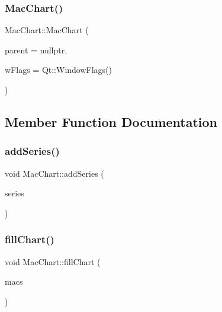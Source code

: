 \subsubsection{\texorpdfstring{Mac\+Chart()}{MacChart()}}
{\footnotesize\ttfamily Mac\+Chart\+::\+Mac\+Chart (\begin{DoxyParamCaption}\item[{Q\+Graphics\+Item $\ast$}]{parent = {\ttfamily nullptr},  }\item[{Qt\+::\+Window\+Flags}]{w\+Flags = {\ttfamily Qt\+:\+:WindowFlags()} }\end{DoxyParamCaption})\hspace{0.3cm}{\ttfamily [explicit]}}



\subsection{Member Function Documentation}
\mbox{\label{class_mac_chart_aef583e4cf5c78a34c43c9f86a08eefee}} 
\subsubsection{\texorpdfstring{add\+Series()}{addSeries()}}
{\footnotesize\ttfamily void Mac\+Chart\+::add\+Series (\begin{DoxyParamCaption}\item[{Q\+Horizontal\+Bar\+Series $\ast$}]{series }\end{DoxyParamCaption})}

\mbox{\label{class_mac_chart_aefd498e08bca6b605022d68f04e76666}} 
\subsubsection{\texorpdfstring{fill\+Chart()}{fillChart()}}
{\footnotesize\ttfamily void Mac\+Chart\+::fill\+Chart (\begin{DoxyParamCaption}\item[{Q\+Vector$<$ \hyperlink{class_mac_occurrence}{Mac\+Occurrence} $>$}]{macs }\end{DoxyParamCaption})}

\mbox{\label{class_mac_chart_a7fed27808adb5d9372b934d848c287cf}} 
